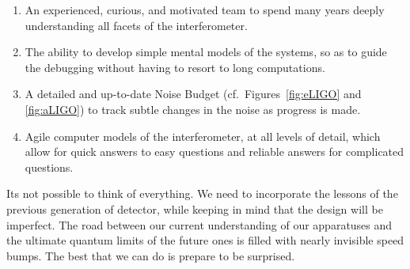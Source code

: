 \begin{enumerate}
\item An experienced, curious, and motivated team to spend many years
  deeply understanding all facets of the interferometer.
\item The ability to develop simple mental models of the systems, so
  as to guide the debugging without having to resort to long
  computations.
\item A detailed and up-to-date Noise Budget
  (cf.~Figures~\ref{fig:eLIGO} and \ref{fig:aLIGO}) to track subtle
  changes in the noise as progress is made.
\item Agile computer models of the interferometer, at all levels of
  detail, which allow for quick answers to easy questions and reliable
  answers for complicated questions.
\end{enumerate}



Its not possible to think of everything. We need to incorporate the lessons of
the previous generation of detector, while keeping in mind that the design will
be imperfect. The road between our current understanding of our
apparatuses and the ultimate quantum limits of the future ones is
filled with nearly invisible speed bumps. The best that we can do is
prepare to be surprised.
